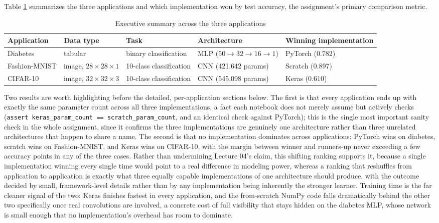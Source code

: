 \documentclass[11pt]{article}
\newcommand{\code}[1]{\texttt{#1}}
\begin{document}
Table \ref{tab:exec-summary} summarizes the three applications and which
implementation won by test accuracy, the assignment's primary comparison
metric.

\begin{table}[H]
\centering
\caption{Executive summary across the three applications}
\label{tab:exec-summary}
\small
\begin{tabular}{@{}p{2.2cm}p{2.4cm}p{2.6cm}p{2.9cm}p{2.6cm}@{}}
\toprule
Application & Data type & Task & Architecture & Winning implementation \\
\midrule
Diabetes & tabular & binary classification & MLP ($50 \to 32 \to 16 \to 1$) & PyTorch (0.782) \\
Fashion-MNIST & image, $28\times28\times1$ & 10-class classification & CNN (421,642 params) & Scratch (0.897) \\
CIFAR-10 & image, $32\times32\times3$ & 10-class classification & CNN (545,098 params) & Keras (0.610) \\
\bottomrule
\end{tabular}
\end{table}

Two results are worth highlighting before the detailed, per-application
sections below. The first is that every application ends up with exactly the
same parameter count across all three implementations, a fact each notebook
does not merely assume but actively checks
(\code{assert keras\_param\_count == scratch\_param\_count}, and an identical
check against PyTorch); this is the single most important sanity check in
the whole assignment, since it confirms the three implementations are
genuinely one architecture rather than three unrelated architectures that
happen to share a name. The second is that no implementation dominates
across applications: PyTorch wins on diabetes, scratch wins on Fashion-MNIST,
and Keras wins on CIFAR-10, with the margin between winner and runners-up
never exceeding a few accuracy points in any of the three cases. Rather than
undermining Lecture 04's claim, this shifting ranking supports it, because a
single implementation winning every single time would point to a real
difference in modeling power, whereas a ranking that reshuffles from
application to application is exactly what three equally capable
implementations of one architecture should produce, with the outcome decided
by small, framework-level details rather than by any implementation being
inherently the stronger learner. Training time is the far cleaner signal of
the two: Keras finishes fastest in every application, and the from-scratch
NumPy code falls dramatically behind the other two specifically once real
convolutions are involved, a concrete cost of full visibility that stays
hidden on the diabetes MLP, whose network is small enough that no
implementation's overhead has room to dominate.
\end{document}
